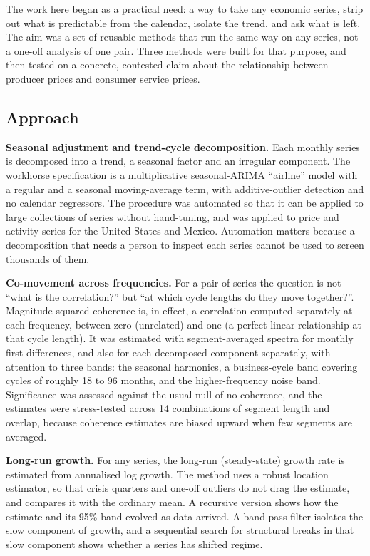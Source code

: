\documentclass[
  british,
  a4paper,
]{article}
\begin{document}
The work here began as a practical need: a way to take any economic
series, strip out what is predictable from the calendar, isolate the
trend, and ask what is left. The aim was a set of reusable methods that
run the same way on any series, not a one-off analysis of one pair.
Three methods were built for that purpose, and then tested on a
concrete, contested claim about the relationship between producer prices
and consumer service prices.

\subsection{Approach}\label{approach}

\textbf{Seasonal adjustment and trend-cycle decomposition.} Each monthly
series is decomposed into a trend, a seasonal factor and an irregular
component. The workhorse specification is a multiplicative
seasonal-ARIMA ``airline'' model with a regular and a seasonal
moving-average term, with additive-outlier detection and no calendar
regressors. The procedure was automated so that it can be applied to
large collections of series without hand-tuning, and was applied to
price and activity series for the United States and Mexico. Automation
matters because a decomposition that needs a person to inspect each
series cannot be used to screen thousands of them.

\textbf{Co-movement across frequencies.} For a pair of series the
question is not ``what is the correlation?'' but ``at which cycle
lengths do they move together?''. Magnitude-squared coherence is, in
effect, a correlation computed separately at each frequency, between
zero (unrelated) and one (a perfect linear relationship at that cycle
length). It was estimated with segment-averaged spectra for monthly
first differences, and also for each decomposed component separately,
with attention to three bands: the seasonal harmonics, a business-cycle
band covering cycles of roughly 18 to 96 months, and the
higher-frequency noise band. Significance was assessed against the usual
null of no coherence, and the estimates were stress-tested across 14
combinations of segment length and overlap, because coherence estimates
are biased upward when few segments are averaged.

\textbf{Long-run growth.} For any series, the long-run (steady-state)
growth rate is estimated from annualised log growth. The method uses a
robust location estimator, so that crisis quarters and one-off outliers
do not drag the estimate, and compares it with the ordinary mean. A
recursive version shows how the estimate and its 95\% band evolved as
data arrived. A band-pass filter isolates the slow component of growth,
and a sequential search for structural breaks in that slow component
shows whether a series has shifted regime.
\end{document}

